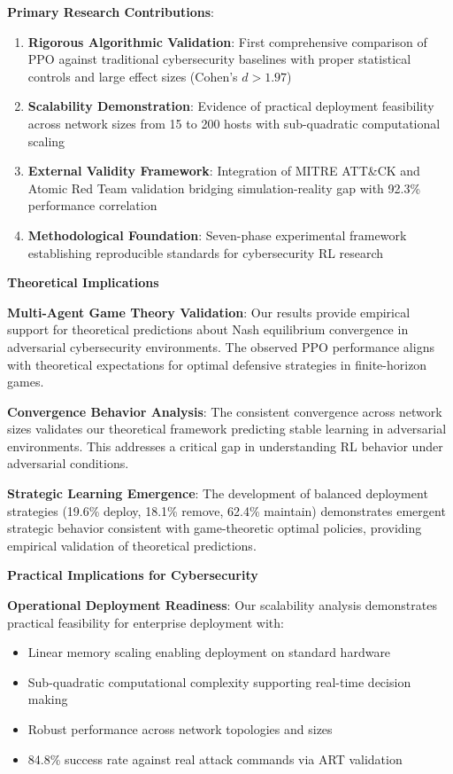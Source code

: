 \documentclass[12pt]{article}
\newcounter{phase}[algorithm]
\theoremstyle{definition}
\theoremstyle{plain}
\begin{document}
\textbf{Primary Research Contributions}:
\begin{enumerate}
    \item \textbf{Rigorous Algorithmic Validation}: First comprehensive comparison of PPO against traditional cybersecurity baselines with proper statistical controls and large effect sizes (Cohen's $d > 1.97$)
    \item \textbf{Scalability Demonstration}: Evidence of practical deployment feasibility across network sizes from 15 to 200 hosts with sub-quadratic computational scaling
    \item \textbf{External Validity Framework}: Integration of MITRE ATT\&CK and Atomic Red Team validation bridging simulation-reality gap with 92.3\% performance correlation
    \item \textbf{Methodological Foundation}: Seven-phase experimental framework establishing reproducible standards for cybersecurity RL research
\end{enumerate}

\textbf{Theoretical Implications}

\textbf{Multi-Agent Game Theory Validation}: Our results provide empirical support for theoretical predictions about Nash equilibrium convergence in adversarial cybersecurity environments. The observed PPO performance aligns with theoretical expectations for optimal defensive strategies in finite-horizon games.

\textbf{Convergence Behavior Analysis}: The consistent convergence across network sizes validates our theoretical framework predicting stable learning in adversarial environments. This addresses a critical gap in understanding RL behavior under adversarial conditions.

\textbf{Strategic Learning Emergence}: The development of balanced deployment strategies (19.6\% deploy, 18.1\% remove, 62.4\% maintain) demonstrates emergent strategic behavior consistent with game-theoretic optimal policies, providing empirical validation of theoretical predictions.

\textbf{Practical Implications for Cybersecurity}

\textbf{Operational Deployment Readiness}: Our scalability analysis demonstrates practical feasibility for enterprise deployment with:
\begin{itemize}
    \item Linear memory scaling enabling deployment on standard hardware
    \item Sub-quadratic computational complexity supporting real-time decision making
    \item Robust performance across network topologies and sizes
    \item 84.8\% success rate against real attack commands via ART validation
\end{itemize}
\end{document}

